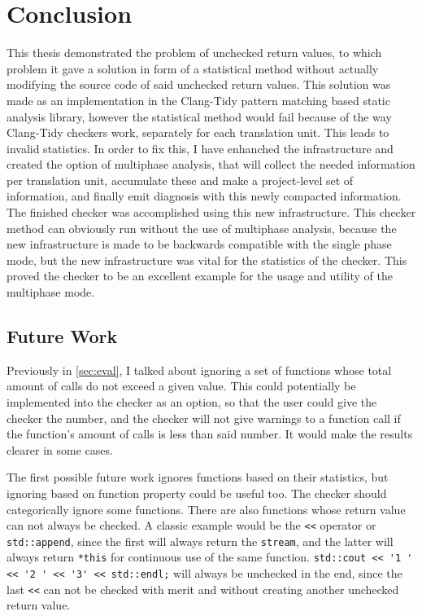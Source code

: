 \chapter{Conclusion}
\label{ch:sum}

This thesis demonstrated the problem of unchecked return values, to which problem it gave a solution in form of a statistical method without
actually modifying the source code of said unchecked return values. This solution was made as an implementation in the Clang-Tidy pattern
matching based static analysis library, however the statistical method would fail because of the way Clang-Tidy checkers work, separately
for each translation unit. This leads to invalid statistics. In order to fix this, I have enhanched the infrastructure and created the
option of multiphase analysis, that will collect the needed information per translation unit, accumulate these and make a project-level set
of information, and finally emit diagnosis with this newly compacted information. The finished checker was accomplished using this new
infrastructure. This checker method can obviously run without the use of multiphase analysis, because the new infrastructure is made to be
backwards compatible with the single phase mode, but the new infrastructure was vital for the statistics of the checker. This proved the
checker to be an excellent example for the usage and utility of the multiphase mode.

\section{Future Work}

Previously in \cref{sec:eval}, I talked about ignoring a set of functions whose total amount of calls do not exceed a given value. This could
potentially be implemented into the checker as an option, so that the user could give the checker the number, and the checker will not give
warnings to a function call if the function's amount of calls is less than said number. It would make the results clearer in some cases.

The first possible future work ignores functions based on their statistics, but ignoring based on function property could be useful too.
The checker should categorically ignore some functions. There are also functions whose return value can not always be checked. A classic
example would be the \lstinline{<<} operator or \lstinline{std::append}, since the first will always return the \texttt{stream}, and the latter
will always return \lstinline{*this} for continuous use of the same function. \lstinline{std::cout << '1 ' << '2 ' << '3' << std::endl;} will
always be unchecked in the end, since the last \lstinline{<<} can not be checked with merit and without creating another unchecked return value.

